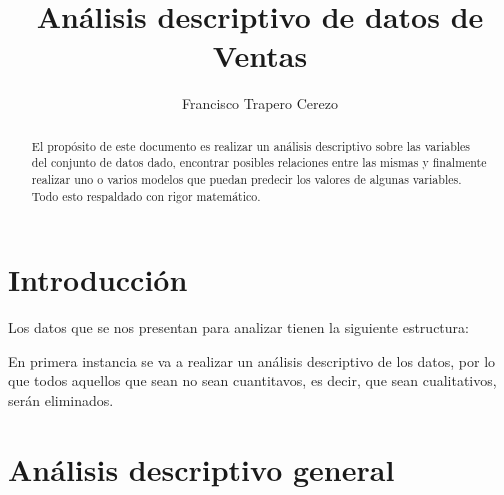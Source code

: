 \documentclass{article}
\begin{document}
\title{Análisis descriptivo de datos de Ventas}
\author{Francisco Trapero Cerezo}

\maketitle

\begin{abstract}
El propósito de este documento es realizar un análisis descriptivo sobre las variables del conjunto de datos dado, encontrar posibles relaciones entre las mismas y finalmente realizar uno o varios modelos que puedan predecir los valores de algunas variables. Todo esto respaldado con rigor matemático.
\end{abstract}
\newpage

\tableofcontents
\newpage

\section{Introducción}
Los datos que se nos presentan para analizar tienen la siguiente estructura:



\FloatBarrier

En primera instancia se va a realizar un análisis descriptivo de los datos, por lo que todos aquellos que sean no sean cuantitavos, es decir, que sean cualitativos, serán eliminados.

\section{Análisis descriptivo general}
\end{document}
